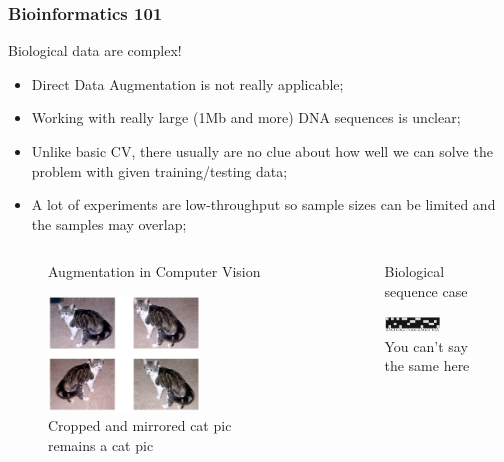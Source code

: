 \documentclass[11pt,xcolor=x11names,compress]{beamer}
\renewcommand{\(}{\begin{columns}}
\renewcommand{\)}{\end{columns}}
\newcommand{\<}[1]{\begin{column}{#1}}
\renewcommand{\>}{\end{column}}
\begin{document}
\begin{frame}
	\frametitle{Bioinformatics 101}
	\scriptsize
	Biological data are complex!
	\begin{itemize}
		\item Direct Data Augmentation is not really applicable;
		\item Working with really large (1Mb and more) DNA sequences is unclear;
		\item Unlike basic CV, there usually are no clue about how well we can solve the problem with given training/testing data;
		\item A lot of experiments are low-throughput so sample sizes can be limited and the samples may overlap;
	\end{itemize}
	\begin{columns}
	\begin{column}{0.5\textwidth}
		\begin{figure}
			\caption*{\tiny{Augmentation in Computer Vision}}
			\includegraphics[width=0.65\textwidth]{statement1.png}
			\caption*{\tiny{Cropped and mirrored cat pic remains a cat pic}}
		\end{figure}
	\end{column}
	\begin{column}{0.5\textwidth}
		\begin{figure}
			\caption*{\tiny{Biological sequence case}}
			\includegraphics[width=0.65\textwidth]{statement2.png}
			\caption*{\tiny{You can't say the same here}}
		\end{figure}
	\end{column}
	\end{columns}
\end{frame}
\end{document}
